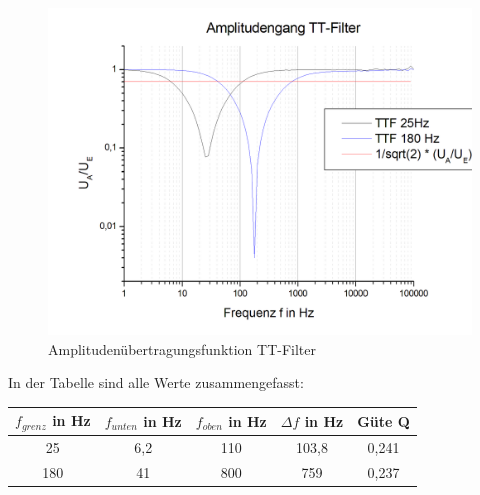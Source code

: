 \documentclass{scrartcl}						%
\begin{document}
			\begin{figure}[h!]
					\centering
					\includegraphics[scale=0.4]{A1b}
					\caption{Amplitudenübertragungsfunktion TT-Filter}
			\end{figure}
			
			In der Tabelle sind alle Werte zusammengefasst:
			\center
			\begin{tabular}{|c|c|c|c|c|}
			\hline $f_{grenz} $ in Hz & $f_{unten}$ in Hz & $f_{oben}$ in Hz & $\Delta f$ in Hz & Güte Q \\ 
			\hline 25 & 6,2 & 110 & 103,8 & 0,241 \\ 
			\hline 180 & 41 & 800 & 759 & 0,237 \\ 
			\hline 
			\end{tabular} 
			\flushleft
			
\end{document}
